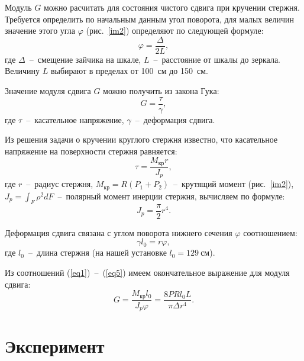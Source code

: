 \documentclass[12pt, a4paper]{article}
\begin{document}
    Модуль $G$ можно расчитать для состояния чистого сдвига при кручении стержня. Требуется определить по начальным данным угол поворота, для малых величин значение этого угла $\varphi$ (рис.~\ref{im2}) определяют по следующей формуле:
    \begin{equation}
        \varphi = \frac{\Delta}{2L},
        \label{eq1}
    \end{equation}
    где $\Delta$~--~смещение зайчика на шкале, $L$~--~расстояние от шкалы до зеркала. Величину $L$ выбирают в пределах  от 100~см до 150~см.
    
    Значение модуля сдвига $G$ можно получить из закона Гука:
    \begin{equation}
        G = \frac{\tau}{\gamma},
        \label{eq2}
    \end{equation}
    где $\tau$~--~касательное напряжение, $\gamma$~--~деформация сдвига.
    
    Из решения задачи о кручении круглого стержня известно, что касательное напряжение на поверхности стержня равняется:
    \begin{equation}
        \tau = \frac{M_\text{кр}r}{J_{p}},
        \label{eq3}
    \end{equation}
    где $r$~--~радиус стержня, $M_\text{кр} = R(P_{1} + P_{2})$~--~крутящий момент (рис.~\ref{im2}), $J_{p} = \int_{F} \rho^{2} dF$~--~полярный момент инерции стержня, вычисляем по формуле:
    \begin{equation}
        J_{p} = \frac{\pi}{2} r^{4}.
        \label{eq4}
    \end{equation}
    
    Деформация сдвига связана с углом поворота нижнего сечения $\varphi$ соотношением:
    \begin{equation}
        \gamma l_{0} = r\varphi,
        \label{eq5}
    \end{equation}
    где $l_{0}$~--~длина стержня (на нашей установке $l_{0} = 129~\text{см}$).
    
    Из соотношений (\ref{eq1})~--~(\ref{eq5}) имеем окончательное выражение для модуля сдвига:
    \begin{equation}
        G = \frac{M_{\text{кр}}l_{0}}{J_{p}\varphi} = \frac{8 P R l_{0} L}{\pi \Delta r^{4}}.
        \label{eq6}
    \end{equation}
    
    \newpage
    
    \section{Эксперимент}
    
\end{document}
